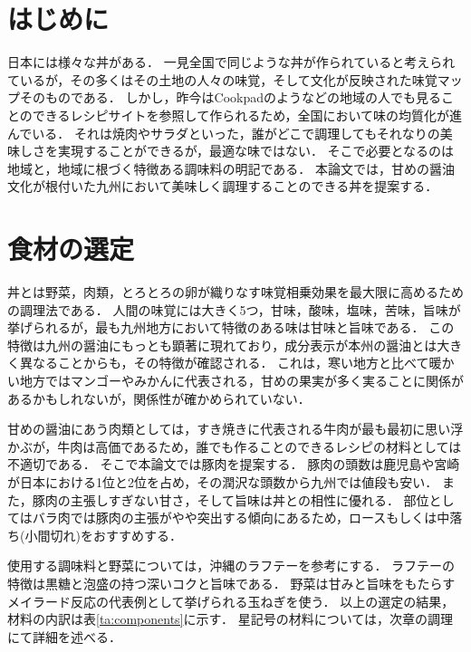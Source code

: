 \section{はじめに}\label{ux306fux3058ux3081ux306b}

日本には様々な丼がある．
一見全国で同じような丼が作られていると考えられているが，その多くはその土地の人々の味覚，そして文化が反映された味覚マップそのものである．
しかし，昨今はCookpadのようなどの地域の人でも見ることのできるレシピサイトを参照して作られるため，全国において味の均質化が進んでいる．
それは焼肉やサラダといった，誰がどこで調理してもそれなりの美味しさを実現することができるが，最適な味ではない．
そこで必要となるのは地域と，地域に根づく特徴ある調味料の明記である．
本論文では，甘めの醤油文化が根付いた九州において美味しく調理することのできる丼を提案する．

\section{食材の選定}\label{ux98dfux6750ux306eux9078ux5b9a}

丼とは野菜，肉類，とろとろの卵が織りなす味覚相乗効果を最大限に高めるための調理法である．
人間の味覚には大きく5つ，甘味，酸味，塩味，苦味，旨味が挙げられるが，最も九州地方において特徴のある味は甘味と旨味である．
この特徴は九州の醤油にもっとも顕著に現れており，成分表示が本州の醤油とは大きく異なることからも，その特徴が確認される．
これは，寒い地方と比べて暖かい地方ではマンゴーやみかんに代表される，甘めの果実が多く実ることに関係があるかもしれないが，関係性が確かめられていない．

甘めの醤油にあう肉類としては，すき焼きに代表される牛肉が最も最初に思い浮かぶが，牛肉は高価であるため，誰でも作ることのできるレシピの材料としては不適切である．
そこで本論文では豚肉を提案する．
豚肉の頭数は鹿児島や宮崎が日本における1位と2位を占め，その潤沢な頭数から九州では値段も安い．
また，豚肉の主張しすぎない甘さ，そして旨味は丼との相性に優れる．
部位としてはバラ肉では豚肉の主張がやや突出する傾向にあるため，ロースもしくは中落ち(小間切れ)をおすすめする．

使用する調味料と野菜については，沖縄のラフテーを参考にする．
ラフテーの特徴は黒糖と泡盛の持つ深いコクと旨味である．
野菜は甘みと旨味をもたらすメイラード反応の代表例として挙げられる玉ねぎを使う\cite{maillard}．
以上の選定の結果，材料の内訳は表\ref{ta:components}に示す．
星記号の材料については，次章の調理にて詳細を述べる．

